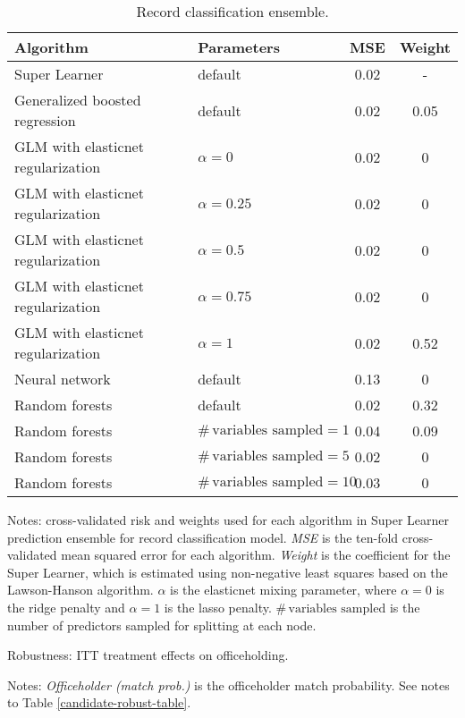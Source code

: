 \begin{table}[htbp]
	\begin{center}
		\caption{Record classification ensemble.\label{ensemble-tab-link}} 
		\begin{tabular}{llcc}
			\hline
			Algorithm & Parameters & MSE & Weight \\ 
			\hline
			\rowcolor{Gray}
			Super Learner & default & 0.02 & - \\
			Generalized boosted regression &  default & 0.02 & 0.05 \\ 
			GLM with elasticnet regularization	 &  $\alpha=0$ & 0.02 & 0 \\  %
			GLM with elasticnet regularization	 &  $\alpha=0.25$ & 0.02& 0 \\ 
			GLM with elasticnet regularization 	&  $\alpha=0.5$ & 0.02 & 0 \\ 
			GLM with elasticnet regularization 	 &  $\alpha=0.75$ & 0.02 & 0 \\ 
			GLM with elasticnet regularization 	 &  $\alpha=1$ & 0.02 & 0.52 \\  %
			Neural network  &  default & 0.13 & 0 \\ 
			Random forests 	& default & 0.02 & 0.32 \\ 
			Random forests 	 & $\# \, \text{variables sampled} =1$ & 0.04 & 0.09 \\ 
			Random forests 	  & $\# \, \text{variables sampled}=5$  & 0.02 & 0 \\ 
			Random forests 	 & $\# \, \text{variables sampled}=10$ & 0.03 & 0 \\ 
			\hline
		\end{tabular} 
	\end{center}
	\footnotesize{Notes: cross-validated risk and weights used for each algorithm in Super Learner prediction ensemble for record classification model. \textit{MSE} is the ten-fold cross-validated mean squared error for each algorithm. \textit{Weight} is the coefficient for the Super Learner, which is estimated using non-negative least squares based on the Lawson-Hanson algorithm. $\alpha$ is the elasticnet mixing parameter, where $\alpha = 0$ is the ridge penalty and $\alpha = 1$ is the lasso penalty. $\# \, \text{variables sampled}$ is the number of predictors sampled for splitting at each node.}
\end{table}

\begin{table}[htbp] 
	\begin{center}
		\caption{Robustness: ITT treatment effects on officeholding.}   \label{officeholding-robust-table}
		\resizebox{0.8\width}{!}{}
	\end{center}
	\footnotesize{Notes: \textit{Officeholder (match prob.)} is the officeholder match probability. See notes to Table \ref{candidate-robust-table}.}  
\end{table} 

